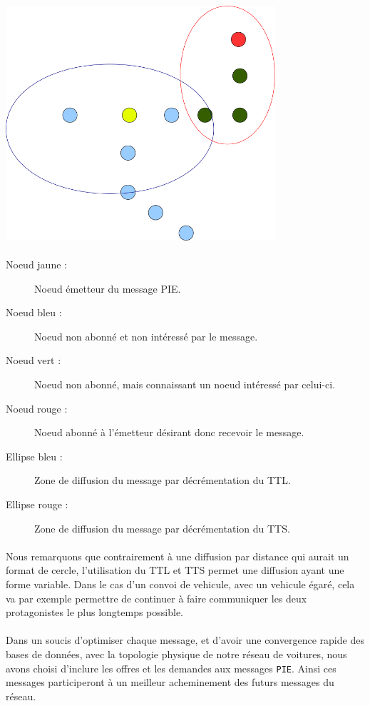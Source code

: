 \begin{center}
	\includegraphics[width=0.75\textwidth]{img/schema}
\end{center}

\paragraph*{}
\begin{description}
	\item[Noeud jaune :] Noeud émetteur du message PIE.
	\item[Noeud bleu :] Noeud non abonné et non intéressé par le message.
	\item[Noeud vert :] Noeud non abonné, mais connaissant un noeud intéressé par celui-ci.
	\item[Noeud rouge :] Noeud abonné à l'émetteur désirant donc recevoir le message.
	\item[Ellipse bleu :] Zone de diffusion du message par décrémentation du TTL.
	\item[Ellipse rouge :] Zone de diffusion du message par décrémentation du TTS.
\end{description}
\paragraph*{}
Nous remarquons que contrairement à une diffusion par distance qui aurait un format de cercle, l'utilisation du TTL et TTS permet une diffusion ayant une forme variable. Dans le cas d'un convoi de vehicule, avec un vehicule égaré, cela va par exemple permettre de continuer à faire communiquer les deux protagonistes le plus longtemps possible.


\paragraph*{}
Dans un soucis d'optimiser chaque message, et d'avoir une convergence rapide des bases de données, avec la topologie physique de notre réseau de voitures, nous avons choisi d'inclure les offres et les demandes aux messages \texttt{PIE}. Ainsi ces messages participeront à un meilleur acheminement des futurs messages du réseau.
